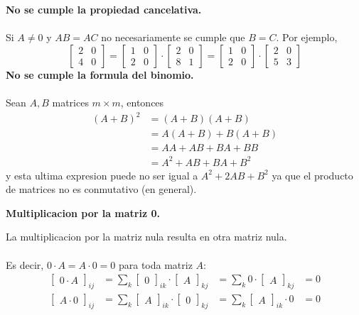 \documentclass{article}
\theoremstyle{definition}
\theoremstyle{definition}
\theoremstyle{remark}
\begin{document}
\textbf{No se cumple la propiedad cancelativa.}\\\\
Si $A \neq 0$ y $AB=AC$ no necesariamente se cumple que $B=C$. Por ejemplo, 
\[
  \begin{bmatrix} 2 & 0 \\ 4 & 0 \end{bmatrix} = \begin{bmatrix}1 & 0 \\2 & 0 \end{bmatrix} \cdot \begin{bmatrix}2 & 0 \\ 8 & 1 \end{bmatrix} = \begin{bmatrix}1 & 0 \\ 2 & 0 \end{bmatrix} \cdot \begin{bmatrix}2 & 0 \\ 5 & 3 \end{bmatrix}
\]
\textbf{No se cumple la formula del binomio.}\\\\
Sean $A,B$ matrices $ m \times m$, entonces \[
  \begin{aligned} 
    (A+B)^2 & = (A+B)(A+B) \\
            &= A(A+B) + B(A+B) \\
            &= AA + AB + BA + BB \\
            &= A^2 + AB + BA + B^2 
  \end{aligned}
\]
y esta ultima expresion puede no ser igual a $A^2+2AB+B^2$ ya que el producto de matrices no es conmutativo (en general).
\begin{center}
\textbf{Multiplicacion por la matriz 0.}
\end{center}
La multiplicacion por la matriz nula resulta en otra matriz nula. \\\\
Es decir, $0 \cdot A=A\cdot 0=0$ para toda matriz $A$:\[
  \begin{alignedat}{3}
    \begin{bmatrix} 0 \cdot A \end{bmatrix}_{ij} & = \sum_{k}\begin{bmatrix}0\end{bmatrix}_{ik} \cdot \begin{bmatrix} A \end{bmatrix}_{kj} & = \sum_{k}0 \cdot \begin{bmatrix}A\end{bmatrix}_{kj}& = 0 \\
    \begin{bmatrix} A \cdot 0 \end{bmatrix}_{ij} & = \sum_{k}\begin{bmatrix}A \end{bmatrix}_{ik} \cdot \begin{bmatrix}0 \end{bmatrix}_{kj} &= \sum_{k} \begin{bmatrix}A \end{bmatrix}_{ik}\cdot 0 & = 0
  \end{alignedat}
\]
\end{document}
